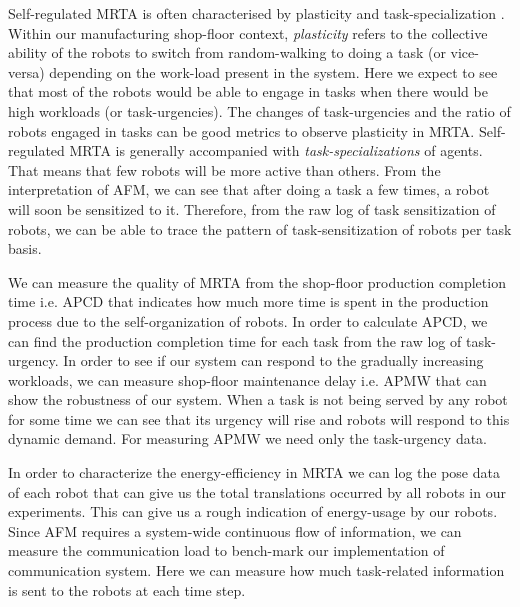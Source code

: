 \documentclass[journal]{IEEEtran}
\begin{document}
Self-regulated MRTA is often characterised by plasticity and task-specialization \cite{Garnier+2007}. Within our manufacturing shop-floor context, \textit{plasticity} refers to the collective ability of the robots to switch from  random-walking to doing a task (or vice-versa) depending on the work-load present in the system. Here we expect to see that most of the robots would be able to engage in tasks when there would be high workloads (or task-urgencies). The changes of task-urgencies and the ratio of robots engaged in tasks can be good metrics to observe plasticity in MRTA.
%
Self-regulated MRTA is generally accompanied with \textit{task-specializations} of agents. That means that few robots will be more active than others. From the interpretation of AFM, we can see that after doing a task a few times, a robot will soon be sensitized to it. Therefore, from the raw log of task sensitization of robots, we can be able to trace the pattern of task-sensitization of robots per task basis.
%

We can measure the quality of MRTA from the shop-floor production completion time i.e. APCD that indicates how much more time is  spent in the production process due to the self-organization of robots.  In order to calculate APCD, we can find the production completion time for each task from the raw log of task-urgency.
%
In order to see if our system can respond to the gradually increasing workloads,  we can measure shop-floor maintenance delay i.e. APMW that can show the robustness of our system. When a task is not being served by any robot for some time we can see that its urgency will rise and robots will respond to this dynamic demand. For measuring APMW we need only the task-urgency data.
%
%

In order to characterize the energy-efficiency in MRTA we can log the pose data of each robot that can give us the total translations occurred by all robots in our experiments. This can give us a rough indication of energy-usage by our robots. 
%
Since AFM requires a system-wide continuous flow of information, we can measure the communication load to bench-mark our implementation of communication system. Here we can measure  how much task-related information is sent to the robots at each time step. 
%
\end{document}
